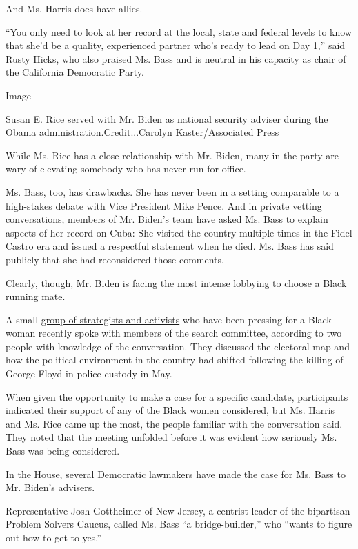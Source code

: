 And Ms. Harris does have allies.

``You only need to look at her record at the local, state and federal
levels to know that she'd be a quality, experienced partner who's ready
to lead on Day 1,'' said Rusty Hicks, who also praised Ms. Bass and is
neutral in his capacity as chair of the California Democratic Party.

Image

Susan E. Rice served with Mr. Biden as national security adviser during
the Obama administration.Credit...Carolyn Kaster/Associated Press

While Ms. Rice has a close relationship with Mr. Biden, many in the
party are wary of elevating somebody who has never run for office.

Ms. Bass, too, has drawbacks. She has never been in a setting comparable
to a high-stakes debate with Vice President Mike Pence. And in private
vetting conversations, members of Mr. Biden's team have asked Ms. Bass
to explain aspects of her record on Cuba: She visited the country
multiple times in the Fidel Castro era and issued a respectful statement
when he died. Ms. Bass has said publicly that she had reconsidered those
comments.

Clearly, though, Mr. Biden is facing the most intense lobbying to choose
a Black running mate.

A small
\href{https://www.nytimes3xbfgragh.onion/2020/06/10/us/politics/joe-biden-black-vice-president.html}{group
of strategists and activists} who have been pressing for a Black woman
recently spoke with members of the search committee, according to two
people with knowledge of the conversation. They discussed the electoral
map and how the political environment in the country had shifted
following the killing of George Floyd in police custody in May.

When given the opportunity to make a case for a specific candidate,
participants indicated their support of any of the Black women
considered, but Ms. Harris and Ms. Rice came up the most, the people
familiar with the conversation said. They noted that the meeting
unfolded before it was evident how seriously Ms. Bass was being
considered.

In the House, several Democratic lawmakers have made the case for Ms.
Bass to Mr. Biden's advisers.

Representative Josh Gottheimer of New Jersey, a centrist leader of the
bipartisan Problem Solvers Caucus, called Ms. Bass ``a bridge-builder,''
who ``wants to figure out how to get to yes.''

